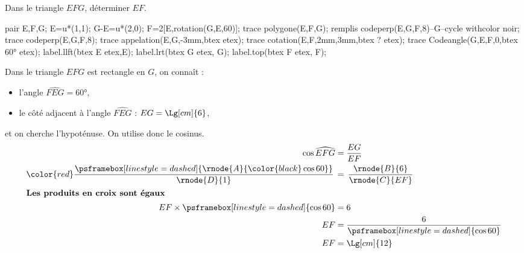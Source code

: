\begin{methode*1}
    \exercice    
    Dans le triangle $EFG$, déterminer $EF$.\\
    \begin{Geometrie}[CoinHD={(4u,5u)}]        
        pair E,F,G;
        E=u*(1,1);
        G-E=u*(2,0);
        F=2[E,rotation(G,E,60)];
        trace polygone(E,F,G);
        remplis codeperp(E,G,F,8)--G--cycle withcolor noir;
        trace codeperp(E,G,F,8);
        trace appelation(E,G,-3mm,btex  etex);        
        trace cotation(E,F,2mm,3mm,btex ? etex);        
        trace Codeangle(G,E,F,0,btex \ang{60} etex);
        label.llft(btex E etex,E);
        label.lrt(btex G etex, G);
        label.top(btex F etex, F);
    \end{Geometrie}
    \correction
    Dans le triangle $EFG$ est rectangle en $G$, on connaît :
    \begin{itemize}
        \item l'angle $\widehat{FEG}=\ang{60}$,
        \item le côté adjacent à l'angle $\widehat{FEG}$ : $EG=\Lg[cm]{6}$,
    \end{itemize}
    et on cherche l'hypoténuse. On utilise donc le cosinus.
    \begin{align*}
        \cos\widehat{EFG}&=\frac{EG}{EF}\\
        {\color{red}\frac{\psframebox[linestyle=dashed]{\rnode{A}{\color{black}\cos60}}}{\rnode{D}{1}}}\,&=\,\frac{\rnode{B}{6}}{\rnode{C}{EF}}\\
        \intertext{\centering\bf Les produits en croix sont égaux}
        EF\times\psframebox[linestyle=dashed]{\cos60}&=6\\
        EF&=\frac{6}{\psframebox[linestyle=dashed]{\cos60}}\\
        EF&=\Lg[cm]{12}
    \end{align*}
\end{methode*1}

